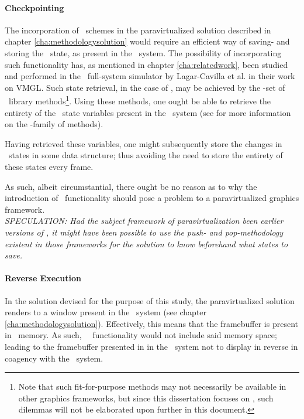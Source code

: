 \paragraph{Checkpointing}
\label{par:appendixa_simicsproductification_checkpointing}
The incorporation of \dvttermcheckpointrestart\ schemes in the paravirtualized solution described in chapter \ref{cha:methodologysolution} would require an efficient way of saving- and storing the \dvttermopengl\ state, as present in the \dvttermhost\ system.
The possibility of incorporating such functionality has, as mentioned in chapter \ref{cha:relatedwork}, been studied and performed in the \dvttermqemu\ full-system simulator by Lagar-Cavilla et al. in their work on VMGL.
Such state retrieval, in the case of \dvttermopenglestwopointo , may be achieved by the -set of \dvttermopengl\ library methods\footnote{Note that such fit-for-purpose methods may not necessarily be available in other graphics frameworks, but since this dissertation focuses on \dvttermopenglestwopointo , such dilemmas will not be elaborated upon further in this document.}.
Using these methods, one ought be able to retrieve the entirety of the \dvttermopengl\ state variables present in the \dvttermhost\ system (see  for more information on the -family of methods).

Having retrieved these variables, one might subsequently store the changes in \dvttermopengl\ states in some data structure; thus avoiding the need to store the entirety of these states every frame.

As such, albeit circumstantial, there ought be no reason as to why the introduction of \dvttermcheckpoint\ functionality should pose a problem to a paravirtualized graphics framework.\\

\textit{SPECULATION: Had the subject framework of paravirtualization been earlier versions of \dvttermopengl , it might have been possible to use the push- and pop-methodology existent in those frameworks for the solution to know beforehand what states to save.}

\paragraph{Reverse Execution}
\label{par:appendixa_simicsproductification_reverseexecution}
In the solution devised for the purpose of this study, the paravirtualized solution renders to a window present in the \dvttermhost\ system (see chapter \ref{cha:methodologysolution}).
Effectively, this means that the framebuffer is present in \dvttermhost\ memory.
As such, \dvttermsimics\ \dvttermreverseexecution\ functionality would not include said memory space; leading to the framebuffer presented in in the \dvttermhost\ system not to display in reverse in coagency with the  \dvttermtarget\ system.

